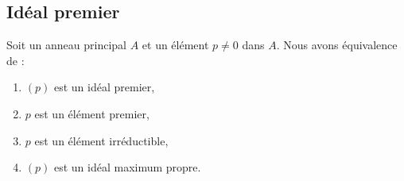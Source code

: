 \subsection{Idéal premier}

\begin{proposition}     \label{PROPooZICGooNmblhl}
	Soit un anneau principal \( A\) et un élément \( p\neq 0\) dans \( A\). Nous avons équivalence de :
	\begin{enumerate}
		\item   \label{ITEMooBTEAooWlFUTX}
		      \( (p)\) est un idéal premier,
		\item   \label{ITEMooKQRMooBNPDMX}
		      \( p\) est un élément premier,
		\item   \label{ITEMooZYYJooCWiBhL}
		      \( p\) est un élément irréductible,
		\item   \label{ITEMooHPAIooYoQzqD}
		      \( (p)\) est un idéal maximum propre.
	\end{enumerate}
\end{proposition}


